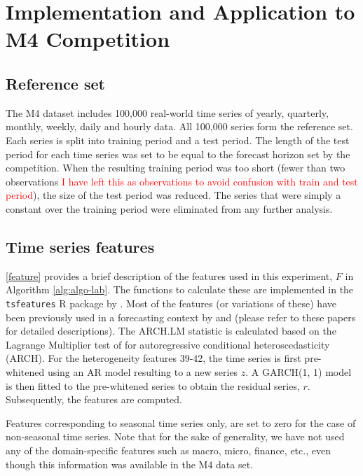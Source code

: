 \documentclass[11pt,a4paper,]{article}
\theoremstyle{definition}
\theoremstyle{definition}
\theoremstyle{definition}
\theoremstyle{remark}
\begin{document}
\clearpage

\section{Implementation and Application to M4
Competition}\label{M4application}

\subsection{Reference set}\label{reference-set}

The M4 dataset includes 100,000 real-world time series of yearly,
quarterly, monthly, weekly, daily and hourly data. All 100,000 series
form the reference set. Each series is split into training period and a
test period. The length of the test period for each time series was set
to be equal to the forecast horizon set by the competition. When the
resulting training period was too short (fewer than two observations
\textcolor{red}{I have left this as observations to avoid confusion with train and test period}),
the size of the test period was reduced. The series that were simply a
constant over the training period were eliminated from any further
analysis.

\subsection{Time series features}\label{time-series-features}

\autoref{feature} provides a brief description of the features used in
this experiment, \(F\) in Algorithm \ref{alg:algo-lab}. The functions to
calculate these are implemented in the \texttt{tsfeatures} R package by
\textcite{tsfeatures}. Most of the features (or variations of these)
have been previously used in a forecasting context by
\textcite{hyndman2015large} and \textcite{fforms} (please refer to these
papers for detailed descriptions). The ARCH.LM statistic is calculated
based on the Lagrange Multiplier test of
\textcite{engle1982autoregressive} for autoregressive conditional
heteroscedasticity (ARCH). For the heterogeneity features 39-42, the
time series is first pre-whitened using an AR model resulting to a new
series \(z\). A GARCH(1, 1) model is then fitted to the pre-whitened
series to obtain the residual series, \(r\). Subsequently, the features
are computed.

Features corresponding to seasonal time series only, are set to zero for
the case of non-seasonal time series. Note that for the sake of
generality, we have not used any of the domain-specific features such as
macro, micro, finance, etc., even though this information was available
in the M4 data set.
\end{document}
